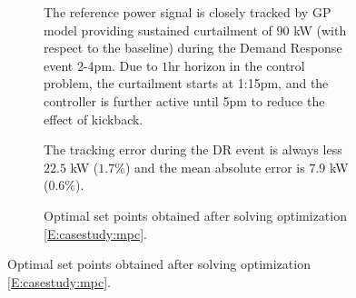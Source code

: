 %	
%	
%		
\begin{figure}[t!]
	\centering
	\begin{subfigure}
		\centering
		\setlength{}
		\setlength{}	
		
		\caption{The reference power signal is closely tracked by GP model providing sustained curtailment of \(90\) kW (with respect to the baseline) during the Demand Response event 2-4pm. Due to \(1\)hr horizon in the control problem, the curtailment starts at 1:15pm, and the controller is further active until 5pm to reduce the effect of kickback.}
		\label{F:control:tracking}
	\end{subfigure}
	\begin{subfigure}
		\centering
		\setlength{}
		\setlength{}	
		
		\caption{The tracking error during the DR event is always less \(22.5\) kW (\(1.7\%\)) and the mean absolute error is \(7.9\) kW (\(0.6\%\)).}
		\label{F:control:error}
	\end{subfigure}
	\begin{subfigure}
		\centering
		\setlength{}
		\setlength{}	
			
		\caption{Optimal set points obtained after solving optimization \eqref{E:casestudy:mpc}.}
		\label{F:control:inputs}
	\end{subfigure}
\end{figure}

